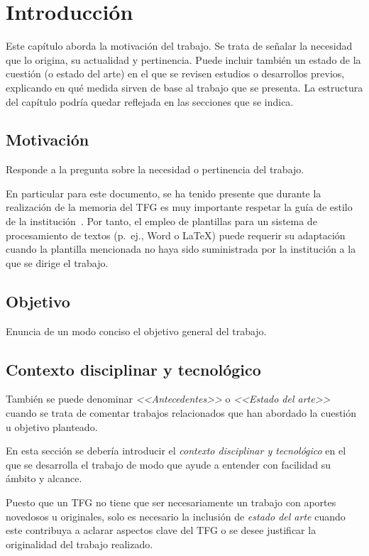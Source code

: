 \chapter{Introducción}
\label{cap:Introduccion}

Este capítulo aborda la motivación del trabajo. Se trata de señalar la necesidad que lo origina, su actualidad y pertinencia. Puede incluir también un estado de la cuestión (o estado del arte) en el que se revisen estudios o desarrollos previos, explicando en qué medida sirven de base al trabajo que se presenta. La estructura del capítulo podría quedar reflejada en las secciones que se indica.

\section{Motivación}
Responde a la pregunta sobre la necesidad o pertinencia del trabajo.

En particular para este documento, se ha tenido presente que durante la realización de la memoria del TFG es muy importante respetar la guía de estilo de la institución~\cite{esi19}. Por tanto, el empleo de plantillas para un sistema de procesamiento de textos (p.~ej., Word o \LaTeX) puede requerir su adaptación cuando la plantilla mencionada no haya sido suministrada por la institución a la que se dirige el trabajo.

\section{Objetivo}
Enuncia de un modo conciso el objetivo general del trabajo.

\section{Contexto disciplinar y tecnológico}
También se puede denominar \emph{<<Antecedentes>>} o \emph{<<Estado del arte>>} cuando se trata de comentar trabajos relacionados que han abordado la cuestión u objetivo planteado.

En esta sección se debería introducir el \emph{contexto disciplinar y tecnológico} en el que se desarrolla el trabajo de modo que ayude a entender con facilidad su ámbito y alcance. 

Puesto que un TFG no tiene que ser necesariamente un trabajo con aportes novedosos u originales, solo es necesario la inclusión de \emph{estado del arte} cuando este contribuya a aclarar aspectos clave del TFG o se desee justificar la originalidad del trabajo realizado.

